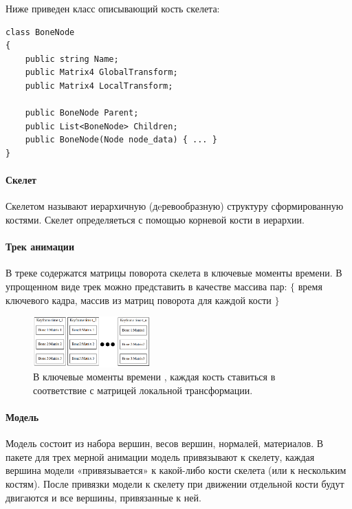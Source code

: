 Ниже приведен класс описывающий кость скелета:
\begin{small}
\begin{verbatim}
class BoneNode
{
    public string Name;
    public Matrix4 GlobalTransform;
    public Matrix4 LocalTransform;

    public BoneNode Parent;
    public List<BoneNode> Children;
    public BoneNode(Node node_data) { ... }
}
\end{verbatim}
\end{small}

\paragraph{Скелет}
Скелетом называют иерархичную (дeревообразную) структуру сформированную костями. Скелет определяеться с помощью корневой кости в иерархии.


\paragraph{Трек анимации}
В треке содержатся матрицы поворота скелета в ключевые моменты времени.
В упрощенном виде трек можно представить в качестве  массива пар: 
$\lbrace$ время ключевого кадра, массив из матриц поворота для каждой кости $\rbrace$

\begin{figure}[h!]
    \centering
    \includegraphics[width=0.4\textwidth]{anim_track.png}
    \caption{\small{В ключевые моменты времени , каждая кость ставиться в соответствие с матрицей локальной трансформации.}}
    
\end{figure}


\paragraph{Модель}
Модель состоит из набора вершин, весов вершин, нормалей, материалов. В пакете для трех мерной анимации модель привязывают к скелету, каждая вершина модели «привязывается» к какой-либо кости скелета (или к нескольким костям). После привязки модели к скелету при движении отдельной кости будут двигаются и все вершины, привязанные к ней.

